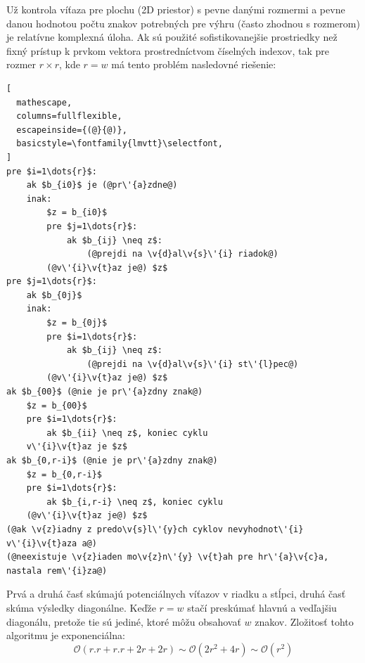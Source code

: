 Už kontrola víťaza pre plochu (2D priestor) s pevne danými rozmermi a pevne danou hodnotou počtu znakov potrebných pre
výhru (často zhodnou s rozmerom) je relatívne komplexná úloha.
Ak sú použité sofistikovanejšie prostriedky než fixný prístup k prvkom vektora prostredníctvom číselných indexov, tak
pre rozmer $r \times r$, kde $r = w$ má tento problém nasledovné riešenie:
\begin{lstlisting}[
  mathescape,
  columns=fullflexible,
  escapeinside={(@}{@)},
  basicstyle=\fontfamily{lmvtt}\selectfont,
]
pre $i=1\dots{r}$:
    ak $b_{i0}$ je (@pr\'{a}zdne@)
    inak:
        $z = b_{i0}$
        pre $j=1\dots{r}$:
            ak $b_{ij} \neq z$:
                (@prejdi na \v{d}al\v{s}\'{i} riadok@)
        (@v\'{i}\v{t}az je@) $z$
pre $j=1\dots{r}$:
    ak $b_{0j}$
    inak:
        $z = b_{0j}$
        pre $i=1\dots{r}$:
            ak $b_{ij} \neq z$:
                (@prejdi na \v{d}al\v{s}\'{i} st\'{l}pec@)
        (@v\'{i}\v{t}az je@) $z$
ak $b_{00}$ (@nie je pr\'{a}zdny znak@)
    $z = b_{00}$
    pre $i=1\dots{r}$:
        ak $b_{ii} \neq z$, koniec cyklu
    v\'{i}\v{t}az je $z$
ak $b_{0,r-i}$ (@nie je pr\'{a}zdny znak@)
    $z = b_{0,r-i}$
    pre $i=1\dots{r}$:
        ak $b_{i,r-i} \neq z$, koniec cyklu
    (@v\'{i}\v{t}az je@) $z$
(@ak \v{z}iadny z predo\v{s}l\'{y}ch cyklov nevyhodnot\'{i} v\'{i}\v{t}aza a@)
(@neexistuje \v{z}iaden mo\v{z}n\'{y} \v{t}ah pre hr\'{a}\v{c}a, nastala rem\'{i}za@)
\end{lstlisting}
Prvá a druhá časť skúmajú potenciálnych víťazov v riadku a stĺpci, druhá časť skúma výsledky diagonálne.
Keďže $r = w$ stačí preskúmať hlavnú a vedľajšiu diagonálu, pretože tie sú jediné, ktoré môžu obsahovať $w$ znakov.
Zložitosť tohto algoritmu je exponenciálna:
\begin{equation}
    \mathcal{O}(r.r + r.r + 2r + 2r) \sim \mathcal{O}(2r^2 + 4r) \sim \mathcal{O}(r^2)
\end{equation}

